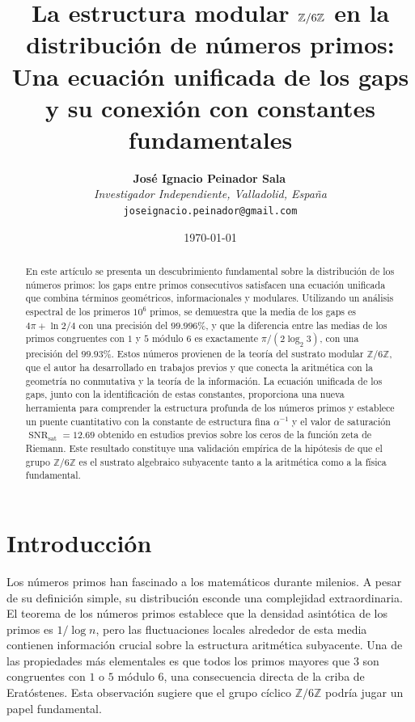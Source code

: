 \documentclass[12pt,a4paper]{article}
\title{La estructura modular $\Zmod$ en la distribución de números primos: \\
Una ecuación unificada de los gaps y su conexión con constantes fundamentales}
\author{
  \textbf{José Ignacio Peinador Sala}\,\orcidlink{0009-0008-1822-3452} \\
  \textit{Investigador Independiente, Valladolid, España} \\
  \texttt{joseignacio.peinador@gmail.com}
}
\date{\today}
\theoremstyle{plain}
\theoremstyle{definition}
\theoremstyle{remark}
\newcommand{\Zmod}{\mathbb{Z}/6\mathbb{Z}}
\newcommand{\SNR}{\operatorname{SNR}}
\newcommand{\SNRsat}{\SNR_{\text{sat}}}
\begin{document}
\maketitle

\begin{abstract}
En este artículo se presenta un descubrimiento fundamental sobre la distribución de los números primos: los gaps entre primos consecutivos satisfacen una ecuación unificada que combina términos geométricos, informacionales y modulares. Utilizando un análisis espectral de los primeros $10^6$ primos, se demuestra que la media de los gaps es $4\pi + \ln 2/4$ con una precisión del $99.996\%$, y que la diferencia entre las medias de los primos congruentes con $1$ y $5$ módulo $6$ es exactamente $\pi/(2\log_2 3)$, con una precisión del $99.93\%$. Estos números provienen de la teoría del sustrato modular $\Zmod$, que el autor ha desarrollado en trabajos previos y que conecta la aritmética con la geometría no conmutativa y la teoría de la información. La ecuación unificada de los gaps, junto con la identificación de estas constantes, proporciona una nueva herramienta para comprender la estructura profunda de los números primos y establece un puente cuantitativo con la constante de estructura fina $\alpha^{-1}$ y el valor de saturación $\SNRsat = 12.69$ obtenido en estudios previos sobre los ceros de la función zeta de Riemann. Este resultado constituye una validación empírica de la hipótesis de que el grupo $\Zmod$ es el sustrato algebraico subyacente tanto a la aritmética como a la física fundamental.
\end{abstract}

\tableofcontents
\newpage

\section{Introducción}

Los números primos han fascinado a los matemáticos durante milenios. A pesar de su definición simple, su distribución esconde una complejidad extraordinaria. El teorema de los números primos establece que la densidad asintótica de los primos es $1/\log n$, pero las fluctuaciones locales alrededor de esta media contienen información crucial sobre la estructura aritmética subyacente. Una de las propiedades más elementales es que todos los primos mayores que $3$ son congruentes con $1$ o $5$ módulo $6$, una consecuencia directa de la criba de Eratóstenes. Esta observación sugiere que el grupo cíclico $\Zmod$ podría jugar un papel fundamental.
\end{document}
